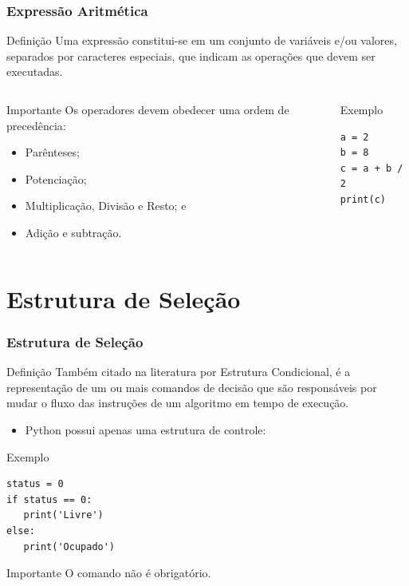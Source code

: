\documentclass[aspectratio=169]{beamer} %
\begin{document}
\begin{frame}[fragile]
\frametitle{Expressão Aritmética}

\begin{block}{Definição}
Uma expressão constitui-se em um conjunto de variáveis e/ou valores, separados por caracteres especiais, que indicam as operações que devem ser executadas.
\end{block} \vfill

 \begin{columns}[c]

\begin{alertblock}{Importante}
Os operadores devem obedecer uma ordem de precedência:
\begin{itemize}
	\item Parênteses;
	\item Potenciação;
	\item Multiplicação, Divisão e Resto; e
	\item Adição e subtração.
\end{itemize}
\end{alertblock} \vfill

\begin{exampleblock}{Exemplo}
	\begin{lstlisting}
a = 2
b = 8
c = a + b / 2
print(c)
	\end{lstlisting}
\end{exampleblock}
\end{columns}
\end{frame}

\section{Estrutura de Seleção}

\begin{frame}[fragile]
\frametitle{Estrutura de Seleção}

\begin{block}{Definição}
Também citado na literatura por Estrutura Condicional, é a
representação de um ou mais comandos de decisão que são responsáveis por mudar o fluxo das instruções de um algoritmo em tempo de execução.
\end{block} \vfill

\begin{itemize}
	\item Python possui apenas uma estrutura de controle: 
\end{itemize}

\begin{exampleblock}{Exemplo}
	\begin{lstlisting}
status = 0
if status == 0:
   print('Livre')
else:
   print('Ocupado')
\end{lstlisting}
\end{exampleblock}\vfill

\begin{alertblock}{Importante}
O comando  não é obrigatório.
\end{alertblock}
\end{frame}
\end{document}
